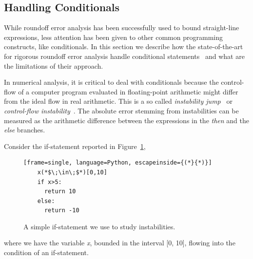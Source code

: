 \subsection{Handling Conditionals}
\label{conditionals}
%
While roundoff error analysis has been successfully used to bound straight-line expressions, less attention has been given to other common programming constructs, like conditionals.
%
In this section we describe how the state-of-the-art for rigorous roundoff error analysis handle conditional statements~\cite{precisa, fluctuat} and what are the limitations of their approach.
%

In numerical analysis, it is critical to deal with conditionals because the control-flow of a computer program evaluated in floating-point arithmetic might differ from the ideal flow in real arithmetic.
%
%
This is a so called \emph{instability jump}~\cite{satire} or \emph{control-flow instability}~\cite{unstable}.
%
The absolute error stemming from instabilities can be measured as the arithmetic difference between the expressions in the \emph{then} and the \emph{else} branches.
%
%

Consider the if-statement reported in Figure~\ref{fig:ifstatement}, 
%
\begin{figure}[tb!]
	\begin{lstlisting}[frame=single, language=Python, escapeinside={(*}{*)}]
	x(*$\;\in\;$*)[0,10]
	if x>5:
	  return 10
	else:
	  return -10	
	\end{lstlisting}
	\caption{A simple if-statement we use to study instabilities.}\label{fig:ifstatement}
\end{figure}
%
where we have the variable \emph{x}, bounded in the interval [0, 10], flowing into the condition of an if-statement.
%

